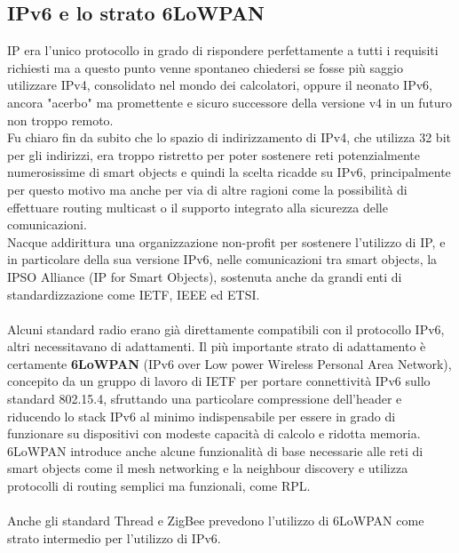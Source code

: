 \subsection{IPv6 e lo strato 6LoWPAN}
IP era l'unico protocollo in grado di rispondere perfettamente a tutti i requisiti richiesti ma a questo punto venne spontaneo chiedersi se fosse più saggio utilizzare IPv4, consolidato nel mondo dei calcolatori, oppure il neonato IPv6, ancora "acerbo" ma promettente e sicuro successore della versione v4 in un futuro non troppo remoto.
\\Fu chiaro fin da subito che lo spazio di indirizzamento di IPv4, che utilizza 32 bit per gli indirizzi, era troppo ristretto per poter sostenere reti potenzialmente numerosissime di smart objects e quindi la scelta ricadde su IPv6, principalmente per questo motivo ma anche per via di altre ragioni come la possibilità di effettuare routing multicast o il supporto integrato alla sicurezza delle comunicazioni.
\\Nacque addirittura una organizzazione non-profit per sostenere l'utilizzo di IP, e in particolare della sua versione IPv6, nelle comunicazioni tra smart objects, la IPSO Alliance (IP for Smart Objects), sostenuta anche da grandi enti di standardizzazione come IETF, IEEE ed ETSI.
\\\\Alcuni standard radio erano già direttamente compatibili con il protocollo IPv6, altri necessitavano di adattamenti. Il più importante strato di adattamento è certamente \textbf{6LoWPAN} (IPv6 over Low power Wireless Personal Area Network), concepito da un gruppo di lavoro di IETF per portare connettività IPv6 sullo standard 802.15.4, sfruttando una particolare compressione dell'header e riducendo lo stack IPv6 al minimo indispensabile per essere in grado di funzionare su dispositivi con modeste capacità di calcolo e ridotta memoria.
\\6LoWPAN introduce anche alcune funzionalità di base necessarie alle reti di smart objects come il mesh networking e la neighbour discovery e utilizza protocolli di routing semplici ma funzionali, come RPL.
\\\\Anche gli standard Thread e ZigBee prevedono l'utilizzo di 6LoWPAN come strato intermedio per l'utilizzo di IPv6.

